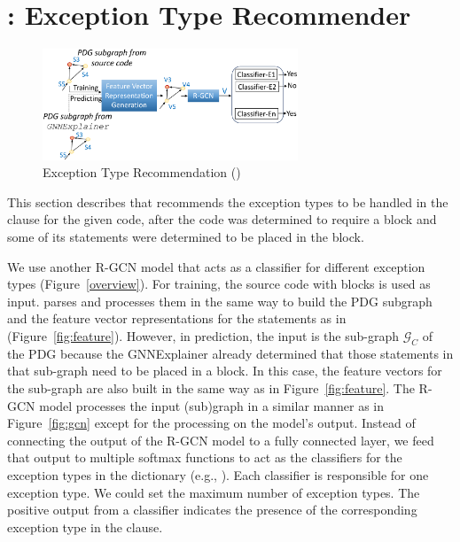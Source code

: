 \section{{\xtype}: Exception Type Recommender}
\label{sec:type}

\begin{figure}[t]
\begin{center}
\includegraphics[width=3in]{xtype-3.png}
\vspace{-10pt}
\caption{Exception Type Recommendation ({\xtype})}
\label{fig:xtype}
\end{center}
\end{figure}

This section describes {\xtype} that recommends the exception types to
be handled in the  clause for the given code, after the code was
determined to require a  block and some of its
statements were determined to be placed in the  block.

We use another R-GCN model that acts as a classifier for different
exception types (Figure~\ref{overview}). For training, the source code
with  blocks is used as input. {\tool} parses and
processes them in the same way to build the PDG subgraph and the
feature vector representations for the statements as in {\xblock}
(Figure~\ref{fig:feature}). However, in prediction, the input is the
sub-graph $\mathcal{G}_C$ of the PDG because the GNNExplainer already
determined that those statements in that sub-graph need to be placed
in a  block. In this case, the feature vectors for the
sub-graph are also built in the same way as in
Figure~\ref{fig:feature}. The R-GCN model processes the input
(sub)graph in a similar manner as in Figure~\ref{fig:gcn} except for the
processing on the model's output. Instead of connecting
the output of the R-GCN model to a fully connected layer, we
feed that output to multiple softmax functions to act as the
classifiers for the exception types in the dictionary (e.g.,
). Each classifier is responsible for one exception
type.  We could set the maximum number of exception types. The
positive output from a classifier indicates the presence of the
corresponding exception type in the  clause.
